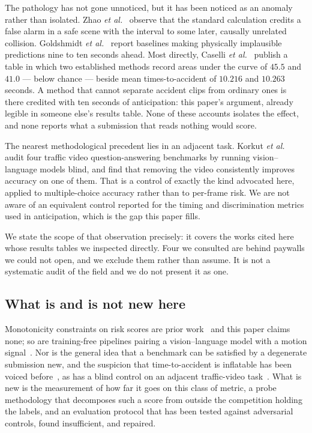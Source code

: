 The pathology has not gone unnoticed, but it has been noticed as an anomaly
rather than isolated. Zhao \textit{et al.}~\cite{zhao2025top} observe that the
standard calculation credits a false alarm in a safe scene with the interval to
some later, causally unrelated collision. Goldshmidt \textit{et
al.}~\cite{goldshmidt2025badas} report baselines making physically implausible
predictions nine to ten seconds ahead. Most directly, Caselli \textit{et
al.}~\cite{caselli2026flara} publish a table in which two established methods
record areas under the curve of $45.5$ and $41.0$ --- below chance --- beside
mean times-to-accident of $10.216$ and $10.263$ seconds. A method that cannot
separate accident clips from ordinary ones is there credited with ten seconds
of anticipation: this paper's argument, already legible in someone else's
results table. None of these accounts isolates the effect, and none reports
what a submission that reads nothing would score.

The nearest methodological precedent lies in an adjacent task. Korkut
\textit{et al.}~\cite{korkut2026blind} audit four traffic video
question-answering benchmarks by running vision--language models blind, and find
that removing the video consistently improves accuracy on one of them. That is
a control of exactly the kind advocated here, applied to multiple-choice
accuracy rather than to per-frame risk. We are not aware of an equivalent
control reported for the timing and discrimination metrics used in
anticipation, which is the gap this paper fills.

We state the scope of that observation precisely: it covers the works cited
here whose results tables we inspected directly. Four we consulted are behind
paywalls we could not open, and we exclude them rather than assume. It is not a
systematic audit of the field and we do not present it as one.

\subsection{What is and is not new here}

Monotonicity constraints on risk scores are prior
work~\cite{pjetri2025nondecreasing, zou2026riskprop} and this paper claims
none; so are training-free pipelines pairing a vision--language model with a
motion signal~\cite{thakur2026modular}. Nor is the general idea that a
benchmark can be satisfied by a degenerate submission new, and the suspicion
that time-to-accident is inflatable has been voiced
before~\cite{zhao2025top, goldshmidt2025badas, caselli2026flara}, as has a blind
control on an adjacent traffic-video task~\cite{korkut2026blind}. What is new is
the measurement of how far it goes on this class of metric, a probe methodology
that decomposes such a score from outside the competition holding the labels,
and an evaluation protocol that has been tested against adversarial controls,
found insufficient, and repaired.
